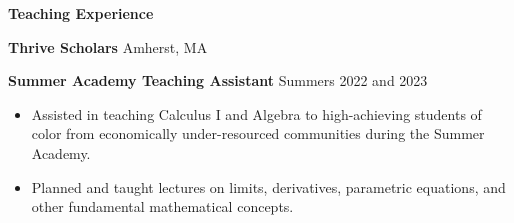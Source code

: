 \begin{center}
    \textbf{Teaching Experience}
\end{center}
\textbf{Thrive Scholars} \hfill Amherst, MA

\textbf{Summer Academy Teaching Assistant} \hfill Summers 2022 and 2023
\begin{itemize}[noitemsep, topsep=0pt, partopsep=0pt, parsep=0pt]
    \item Assisted in teaching Calculus I and Algebra to high-achieving students of color from economically under-resourced communities during the Summer Academy.
    \item Planned and taught lectures on limits, derivatives, parametric equations, and other fundamental mathematical concepts.
\end{itemize}
